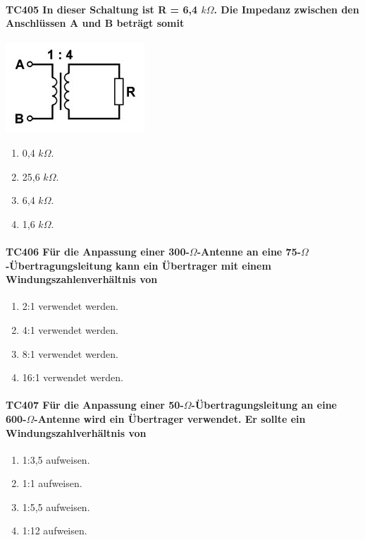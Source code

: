 \documentclass[8pt]{article}
\begin{document}
\begin{enumerate}
\begin{enumerate}[nolistsep,label=\Alph*]
{\paragraph*{TC405 In dieser Schaltung ist R = 6,4 $k\Omega$. Die Impedanz zwischen den Anschlüssen A und B beträgt somit}
\begin{center}
	\begin{minipage}{\linewidth}
		\centering
		\includegraphics[scale=1.0]{pics/tc405_a.jpg}
	\end{minipage}
\end{center}
\begin{enumerate}[nolistsep,label=\Alph*]
\item 0,4 $k\Omega$.
\item 25,6 $k\Omega$.
\item 6,4 $k\Omega$.
\item 1,6 $k\Omega$.
\end{enumerate}

\paragraph*{TC406 Für die Anpassung einer 300-$\Omega$-Antenne an eine 75-$\Omega$-Übertragungsleitung kann ein Übertrager mit einem Windungszahlenverhältnis von}
\begin{enumerate}[nolistsep,label=\Alph*]
\item 2:1 verwendet werden.
\item 4:1 verwendet werden.
\item 8:1 verwendet werden.
\item 16:1 verwendet werden.
\end{enumerate}

\paragraph*{TC407 Für die Anpassung einer 50-$\Omega$-Übertragungsleitung an eine 600-$\Omega$-Antenne wird ein Übertrager verwendet. Er sollte ein Windungszahlverhältnis von}
\begin{enumerate}[nolistsep,label=\Alph*]
\item 1:3,5 aufweisen.
\item 1:1 aufweisen.
\item 1:5,5 aufweisen.
\item 1:12 aufweisen.
\end{enumerate}

}
\end{enumerate}
\end{enumerate}
\end{document}

